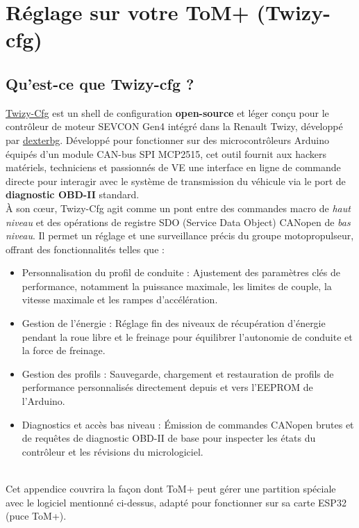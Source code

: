 \appendix
\chapter{Réglage sur votre ToM+ (Twizy-cfg)}
\label{apx:tuning}

\section{Qu'est-ce que Twizy-cfg ?}

\href{http://github.com/dexterbg/Twizy-Cfg}{Twizy-Cfg} est un shell de configuration \textbf{open-source} et léger conçu pour le contrôleur de moteur SEVCON
Gen4 intégré dans la Renault Twizy, développé par \href{https://github.com/dexterbg}{dexterbg}. 
Développé pour fonctionner sur des microcontrôleurs Arduino équipés d'un module CAN-bus SPI MCP2515,
cet outil fournit aux hackers matériels, techniciens et passionnés de VE une interface en ligne
de commande directe pour interagir avec le système de transmission du véhicule via le port de
\textbf{diagnostic OBD-II} standard.\\

À son cœur, Twizy-Cfg agit comme un pont entre des commandes macro de \textit{haut niveau} et des opérations de
registre SDO (Service Data Object) CANopen de \textit{bas niveau}. Il permet un réglage et une
surveillance précis du groupe motopropulseur, offrant des fonctionnalités telles que :\\

\begin{itemize}
    \item Personnalisation du profil de conduite : Ajustement des paramètres clés de performance, notamment la puissance maximale, les limites de couple, la vitesse maximale et les rampes d'accélération.
    \item Gestion de l'énergie : Réglage fin des niveaux de récupération d'énergie pendant la roue libre et le freinage pour équilibrer l'autonomie de conduite et la force de freinage.
    \item Gestion des profils : Sauvegarde, chargement et restauration de profils de performance personnalisés directement depuis et vers l'EEPROM de l'Arduino.
    \item Diagnostics et accès bas niveau : Émission de commandes CANopen brutes et de requêtes de diagnostic OBD-II de base pour inspecter les états du contrôleur et les révisions du micrologiciel.  
\end{itemize}
\  \\
Cet appendice couvrira la façon dont ToM+ peut gérer une partition spéciale avec le logiciel
mentionné ci-dessus, adapté pour fonctionner sur sa carte ESP32 (puce ToM+).


